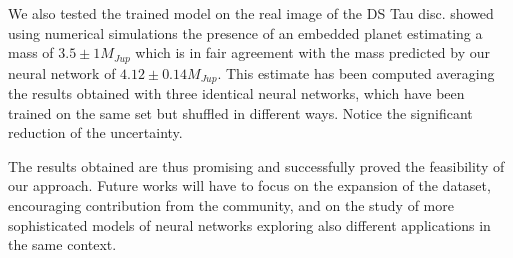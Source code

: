 \documentclass[a4paper,10pt, margin=1cm]{article}
\begin{document}
We also tested the trained model on the real image of the DS Tau disc. \cite{dstauv} showed using numerical simulations
the presence of an embedded planet estimating a mass of $3.5\pm1M_{Jup}$ which is in fair agreement with the mass predicted by our neural network of $4.12\pm0.14M_{Jup}$.
 This estimate has
been computed averaging the results obtained with three identical neural networks, which have been trained on the same set but shuffled in different ways.
Notice the significant reduction of the uncertainty.

The results obtained are thus promising and successfully proved the feasibility 
of our approach. 
Future works will have to focus on the expansion of the dataset, encouraging contribution from the community,
and on the study of more sophisticated models 
of neural networks exploring also different applications in the same context. 


\end{document}
